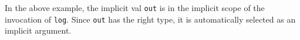 \documentclass[preprint,nocopyrightspace]{sigplanconf}
\newcommand{\ie}{{\em i.e.,~}}
\newcommand{\term}[1]{\mbox{\texttt{#1}}}
\begin{document}
In the above example, the implicit val \term{out} is in the implicit scope of
the invocation of \term{log}. Since \term{out} has the right type, it is automatically
selected as an implicit argument. 

\end{document}

